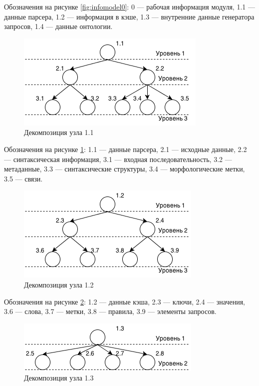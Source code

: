 Обозначения на рисунке \ref{fig:infomodel0}: 0 --- рабочая информация модуля, 1.1 --- данные парсера, 1.2 --- информация в кэше, 1.3 --- внутренние данные генератора запросов, 1.4 --- данные онтологии.

\begin{figure}[H]
	\centering
		\includegraphics[scale=1.0]{images/infomodel1.png}
	\caption{\small Декомпозиция узла 1.1}
	\label{fig:infomodel1}
\end{figure}

Обозначения на рисунке \ref{fig:infomodel1}: 1.1 --- данные парсера, 2.1 --- исходные данные, 2.2 --- синтаксическая информация, 3.1 --- входная последовательность, 3.2 --- метаданные, 3.3 --- синтаксические структуры, 3.4 --- морфологические метки, 3.5 --- связи.

\begin{figure}[H]
	\centering
		\includegraphics[scale=1.0]{images/infomodel2.png}
	\caption{\small Декомпозиция узла 1.2}
	\label{fig:infomodel2}
\end{figure}

Обозначения на рисунке \ref{fig:infomodel2}: 1.2 --- данные кэша, 2.3 --- ключи, 2.4 --- значения, 3.6 --- слова, 3.7 --- метки, 3.8 --- правила, 3.9 --- элементы запросов.

\begin{figure}[H]
	\centering
		\includegraphics[scale=1.0]{images/infomodel3.png}
	\caption{\small Декомпозиция узла 1.3}
	\label{fig:infomodel3}
\end{figure}

